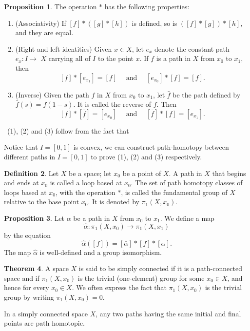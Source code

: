 \documentclass[12pt,a4paper]{book}
\newenvironment{prooff}{{\noindent\it\textcolor{cyan!40!black}{Proof}:}\,}{\par}
\theoremstyle{definition}
\newtheorem{defn}{Definition}[section]
\newtheorem{theo}[defn]{Theorem}
\newtheorem{prop}[defn]{Proposition}
\begin{document}
\begin{prop}
    The operation $*$ has the following properties:
    \begin{enumerate}[(1)]
        \item  (Associativity) If $[f] *([g] *[h])$ is defined, so is $([f] *[g]) *[h]$, and they are equal.
        \item (Right and left identities) Given $x \in X$, let $e_x$ denote the constant path $e_x: I \rightarrow$ $X$ carrying all of $I$ to the point $x$. If $f$ is a path in $X$ from $x_0$ to $x_1$, then
              $$
                  [f] *\left[e_{x_1}\right]=[f] \quad \text { and } \quad\left[e_{x_0}\right] *[f]=[f] .
              $$
        \item  (Inverse) Given the path $f$ in $X$ from $x_0$ to $x_1$, let $\bar{f}$ be the path defined by $\bar{f}(s)=f(1-s)$. It is called the reverse of $f$. Then
              $$
                  [f] *[\bar{f}]=\left[e_{x_0}\right] \quad \text { and } \quad[\bar{f}] *[f]=\left[e_{x_1}\right] .
              $$
    \end{enumerate}
\end{prop}
\begin{prooff}
    (1), (2) and (3) follow from the fact that

    Notice that $I=[0,1]$ is convex, we can construct path-homotopy between different paths in $I=[0,1]$ to prove (1), (2) and (3) respectively.
\end{prooff}
\begin{defn}
    Let $X$ be a space; let $x_0$ be a point of $X$. A path in $X$ that begins and ends at $x_0$ is called a loop based at $x_0$. The set of path homotopy classes of loops based at $x_0$, with the operation $*$, is called the fundamental group of $X$ relative to the base point $x_0$. It is denoted by $\pi_1\left(X, x_0\right)$.
\end{defn}
\begin{prop}
    Let $\alpha$ be a path in $X$ from $x_0$ to $x_1$. We define a map
    $$
        \hat{\alpha}: \pi_1\left(X, x_0\right) \longrightarrow \pi_1\left(X, x_1\right)
    $$
    by the equation
    $$
        \hat{\alpha}([f])=[\bar{\alpha}] *[f] *[\alpha] .
    $$
    The map $\hat{\alpha}$ is well-defined and a group isomorphism.
\end{prop}
\begin{theo}
    A space $X$ is said to be simply connected if it is a path-connected space and if $\pi_1\left(X, x_0\right)$ is the trivial (one-element) group for some $x_0 \in X$, and hence for every $x_0 \in X$. We often express the fact that $\pi_1\left(X, x_0\right)$ is the trivial group by writing $\pi_1\left(X, x_0\right)=0$.

    In a simply connected space $X$, any two paths having the same initial and final points are path homotopic.
\end{theo}
\end{document}
